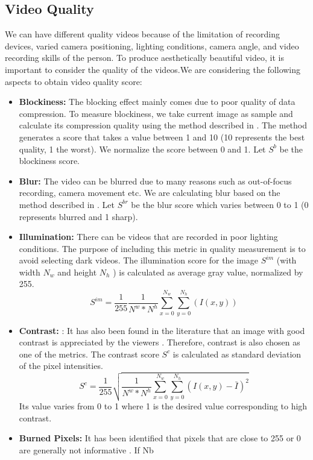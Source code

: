 \documentclass{new}
\begin{document}
\subsection{ Video Quality}
We can have different quality videos because of the limitation of
recording devices, varied camera positioning, lighting conditions,
camera angle, and video recording skills of the person. To produce
aesthetically beautiful video, it is important to consider the quality
of the videos.We are considering the following aspects to obtain
video quality score:
\begin{itemize}
    \item \textbf{Blockiness:} The blocking effect mainly comes due to poor quality of data compression. To measure blockiness, we take
current image as sample and calculate its compression quality
using the method described in \cite{rfc18}. The method generates
a score that takes a value between 1 and 10 (10 represents the
best quality, 1 the worst). We normalize the score between 0
and 1. Let $S^b$ be the blockiness score.
    \item \textbf{Blur:} The video can be blurred due to many reasons such as out-of-focus recording, camera movement etc. We are calculating blur based on the method described in \cite{rfc5}. Let $S^{br}$ be the blur score which varies between 0 to 1 (0 represents
blurred and 1 sharp).
    \item \textbf{Illumination:} There can be videos that are recorded in poor lighting conditions. The purpose of including this metric in quality measurement is to avoid selecting dark videos. The
illumination score for the image $S^{im}$ (with width $N_w$ and
height $N_h$ ) is calculated as average gray value, normalized
by 255.
\begin{equation}
    S^{im} = \frac{1}{255}\frac{1}{N^w * N^h}\sum_{x=0}^{N_w}\sum_{y=0}^{N_h}(I(x,y))
\end{equation}
\item \textbf{Contrast:} : It has also been found in the literature that an image with good contrast is appreciated by the viewers \cite{rfc10}. Therefore, contrast is also chosen as one of the metrics. The contrast score $S^c$ is calculated as standard deviation of the
pixel intensities.
\begin{equation}
    S^c=\frac{1}{255}\sqrt{\frac{1}{N^w*N^h}\sum_{x=0}^{N_w}\sum_{y=0}^{N_h}(I(x,y)-\bar{I})^2}
\end{equation}
Its value varies from 0 to 1 where 1 is the desired value corresponding
to high contrast.
\item \textbf{Burned Pixels:} It has been identified that pixels that are close to 255 or 0 are generally not informative \cite{rfc15}. If Nb

\end{itemize}
\end{document}
